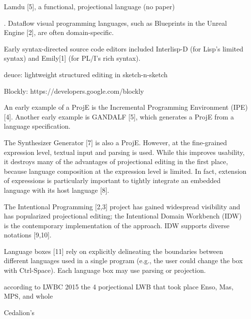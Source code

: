 Lamdu [5], a functional, projectional language (no paper)

. Dataflow visual programming languages, such as Blueprints in the Unreal Engine [2], are often domain-specific.


Early syntax-directed source code editors included Interlisp-D (for Lisp’s limited syntax) and Emily[1] (for PL/I’s rich syntax).

deuce: lightweight structured editing in sketch-n-sketch

Blockly: https://developers.google.com/blockly



An early example of a ProjE is the Incremental Programming Environment (IPE) [4].
Another early example is GANDALF [5], which generates a ProjE from a language specification.

The Synthesizer Generator [7] is also a ProjE.
However, at the fine-grained expression level, textual input and parsing is used.
While this improves usability, it destroys many of the advantages of projectional editing in the first place, because language composition at the expression level is limited.
In fact, extension of expressions is particularly important to tightly integrate an embedded language with its host language [8].

The Intentional Programming [2,3] project has gained widespread visibility and has popularized projectional editing; the Intentional Domain Workbench (IDW) is the contemporary implementation of the approach.
IDW supports diverse notations [9,10].


Language boxes [11] rely on explicitly delineating the boundaries between different languages used in a single program (e.g., the user could change the box with Ctrl-Space).
Each language box may use parsing or projection.


according to LWBC 2015 the 4 porjectional LWB that took place Enso, Mas, MPS, and whole


Cedalion's 







